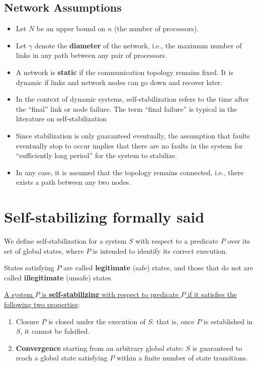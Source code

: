\subsection{Network Assumptions}
\begin{itemize}
   \item Let $N$ be an upper bound on $n$ (the number of processors).
   \item Let $\gamma$ denote the \textbf{diameter} of the network, i.e., the maximum number of links in any path between any pair of processors.
   \item A network is \textbf{static} if the communication topology remains fixed. It is dynamic if links and network nodes can go down and recover later.
   \item In the context of dynamic systems, self-stabilization refers to the time after the “final” link or node failure. The
   term “final failure” is typical in the literature on self-stabilization
   \item Since stabilization is only guaranteed eventually, the assumption that faults eventually stop to occur implies
   that there are no faults in the system for “sufficiently long period” for the system to stabilize.
   \item In any case, it is assumed that the topology remains connected, i.e., there exists a path between any two
   nodes.
\end{itemize}

\section{Self-stabilizing formally said}
We define self-stabilization for a system $S$ with respect to a predicate $P$ over its set of global states, where $P$ is intended to identify its correct execution.

States satisfying $P$ are called \textbf{legitimate} (safe) states, and those that do not are called \textbf{illegitimate} (unsafe) states.

\ul{A system $P$ is \textbf{self-stabilizing} with respect to predicate $P$ if it satisfies the following two properties}:

\begin{enumerate}
	\item Closure $P$ is closed under the execution of $S$: that is, once $P$ is established in $S$, it cannot be falsified.
	\item \textbf{Convergence} starting from an arbitrary global state: $S$ is guaranteed to reach a global state satisfying $P$ within a finite number of state transitions.

\end{enumerate}

